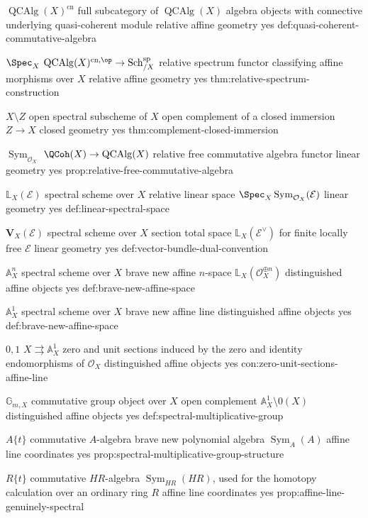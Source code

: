 \begin{longtable}
\CanonicalEntry
{\(\operatorname{QCAlg}(X)^{\mathrm{cn}}\)}
{full subcategory of \(\operatorname{QCAlg}(X)\)}
{algebra objects with connective underlying quasi-coherent module}
{relative affine geometry}
{yes}
{def:quasi-coherent-commutative-algebra}

\CanonicalEntry
{\(\Spec_X\)}
{\(\operatorname{QCAlg}(X)^{\mathrm{cn},\op}\to\operatorname{Sch}^{\mathrm{sp}}_{/X}\)}
{relative spectrum functor classifying affine morphisms over \(X\)}
{relative affine geometry}
{yes}
{thm:relative-spectrum-construction}

\CanonicalEntry
{\(X\setminus Z\)}
{open spectral subscheme of \(X\)}
{open complement of a closed immersion \(Z\to X\)}
{closed geometry}
{yes}
{thm:complement-closed-immersion}

\CanonicalEntry
{\(\operatorname{Sym}_{\mathcal O_X}\)}
{\(\QCoh(X)\to\operatorname{QCAlg}(X)\)}
{relative free commutative algebra functor}
{linear geometry}
{yes}
{prop:relative-free-commutative-algebra}

\CanonicalEntry
{\(\mathbb L_X(\mathcal E)\)}
{spectral scheme over \(X\)}
{relative linear space \(\Spec_X\operatorname{Sym}_{\mathcal O_X}(\mathcal E)\)}
{linear geometry}
{yes}
{def:linear-spectral-space}

\CanonicalEntry
{\(\mathbf V_X(\mathcal E)\)}
{spectral scheme over \(X\)}
{section total space \(\mathbb L_X(\mathcal E^\vee)\) for finite locally free \(\mathcal E\)}
{linear geometry}
{yes}
{def:vector-bundle-dual-convention}

\CanonicalEntry
{\(\mathbb A_X^n\)}
{spectral scheme over \(X\)}
{brave new affine \(n\)-space \(\mathbb L_X(\mathcal O_X^{\oplus n})\)}
{distinguished affine objects}
{yes}
{def:brave-new-affine-space}

\CanonicalEntry
{\(\mathbb A_X^1\)}
{spectral scheme over \(X\)}
{brave new affine line}
{distinguished affine objects}
{yes}
{def:brave-new-affine-space}

\CanonicalEntry
{\(0,1\)}
{\(X\rightrightarrows\mathbb A_X^1\)}
{zero and unit sections induced by the zero and identity endomorphisms of \(\mathcal O_X\)}
{distinguished affine objects}
{yes}
{con:zero-unit-sections-affine-line}

\CanonicalEntry
{\(\mathbb G_{m,X}\)}
{commutative group object over \(X\)}
{open complement \(\mathbb A_X^1\setminus0(X)\)}
{distinguished affine objects}
{yes}
{def:spectral-multiplicative-group}

\CanonicalEntry
{\(A\{t\}\)}
{commutative \(A\)-algebra}
{brave new polynomial algebra \(\operatorname{Sym}_A(A)\)}
{affine line coordinates}
{yes}
{prop:spectral-multiplicative-group-structure}

\CanonicalEntry
{\(R\{t\}\)}
{commutative \(HR\)-algebra}
{\(\operatorname{Sym}_{HR}(HR)\), used for the homotopy calculation over an ordinary ring \(R\)}
{affine line coordinates}
{yes}
{prop:affine-line-genuinely-spectral}

\end{longtable}

